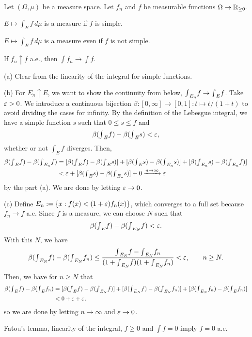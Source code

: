 \documentclass{../../large}
\begin{document}
\begin{prb}
Let $(\Omega,\mu)$ be a measure space.
Let $f_n$ and $f$ be measurable functions $\Omega\to\mathbb{R}_{\ge0}$.
\begin{parts}
\item $E\mapsto\int_Ef\,d\mu$ is a measure if $f$ is simple.
\item $E\mapsto\int_Ef\,d\mu$ is a measure even if $f$ is not simple.
\item If $f_n\uparrow f$ a.e., then $\int f_n\to\int f$.
\end{parts}
\end{prb}
\begin{pf}
(a)
Clear from the linearity of the integral for simple functions.

(b)
For $E_n\uparrow E$, we want to show the continuity from below, ${\textstyle\int}_{E_n}f\to{\textstyle\int}_Ef$.
Take $\varepsilon>0$.
We introduce a continuous bijection $\beta:[0,\infty]\to[0,1]:t\mapsto t/(1+t)$ to avoid dividing the cases for infinity.
By the definition of the Lebesgue integral, we have a simple function $s$ such that $0\le s\le f$ and
\[\beta({\textstyle\int}_Ef)-\beta({\textstyle\int}_Es)<\varepsilon,\]
whether or not $\int_Ef$ diverges.
Then,
\begin{align*}
\beta({\textstyle\int}_Ef)-\beta({\textstyle\int}_{E_n}f)
&=[\beta({\textstyle\int}_Ef)-\beta({\textstyle\int}_Es)]+[\beta({\textstyle\int}_Es)-\beta({\textstyle\int}_{E_n}s)]+[\beta({\textstyle\int}_{E_n}s)-\beta({\textstyle\int}_{E_n}f)]\\
&<\varepsilon+[\beta({\textstyle\int}_Es)-\beta({\textstyle\int}_{E_n}s)]+0\xrightarrow{n\to\infty}\varepsilon
\end{align*}
by the part (a).
We are done by letting $\varepsilon\to0$.

(c)
Define $E_n:=\{x:f(x)<(1+\varepsilon)f_n(x)\}$,
which converges to a full set because $f_n\to f$ a.e.
Since $f$ is a measure, we can choose $N$ such that
\[\beta({\textstyle\int}_Ef)-\beta({\textstyle\int}_{E_N}f)<\varepsilon.\]
With this $N$, we have
\[\beta({\textstyle\int}_{E_N}f)-\beta({\textstyle\int}_{E_N}f_n)\le\frac{{\textstyle\int}_{E_N}f-{\textstyle\int}_{E_N}f_n}{(1+{\textstyle\int}_{E_N}f)(1+{\textstyle\int}_{E_N}f_n)}<\varepsilon,\qquad n\ge N.\]
Then, we have for $n\ge N$ that
\begin{align*}
\beta({\textstyle\int}_Ef)-\beta({\textstyle\int}_Ef_n)
&=[\beta({\textstyle\int}_Ef)-\beta({\textstyle\int}_{E_N}f)]+[\beta({\textstyle\int}_{E_N}f)-\beta({\textstyle\int}_{E_N}f_n)]+[\beta({\textstyle\int}_{E_N}f_n)-\beta({\textstyle\int}_{E}f_n)]\\
&<0+\varepsilon+\varepsilon,
\end{align*}
so we are done by letting $n\to\infty$ and $\varepsilon\to0$.
\end{pf}

\begin{prb}
Fatou's lemma, linearity of the integral, $f\ge0$ and $\int f=0$ imply $f=0$ a.e.
\end{prb}
\end{document}
